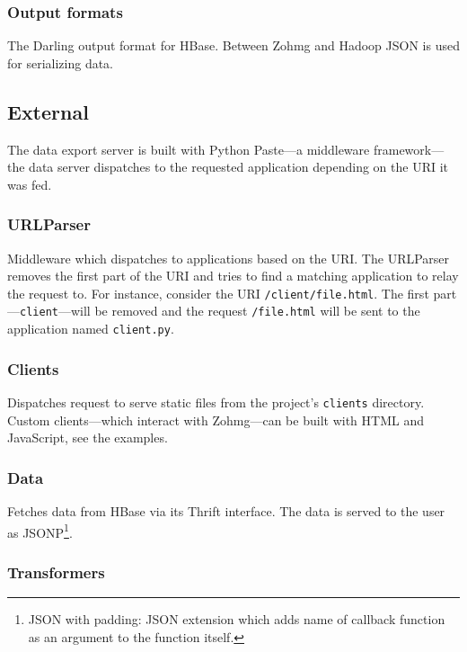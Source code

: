 \documentclass[a4paper,10pt]{book}
\begin{document}
\subsubsection{Output formats}

The Darling output format for HBase. Between Zohmg and Hadoop JSON is used
for serializing data.


\subsection{External}

The data export server is built with Python Paste---a middleware
framework---the data server dispatches to the requested application
depending on the URI it was fed.


\subsubsection{URLParser}

Middleware which dispatches to applications based on the URI. The URLParser
removes the first part of the URI and tries to find a matching application
to relay the request to. For instance, consider the URI
\texttt{/client/file.html}. The first part---\texttt{client}---will be
removed and the request \texttt{/file.html} will be sent to the application
named \texttt{client.py}.


\subsubsection{Clients}

Dispatches request to serve static files from the project's
\texttt{clients} directory. Custom clients---which interact with Zohmg---can
be built with HTML and JavaScript, see the examples.


\subsubsection{Data}

Fetches data from HBase via its Thrift interface. The data is served to the
user as JSONP\footnote{JSON with padding: JSON extension which adds name of
callback function as an argument to the function itself.}.


\subsubsection{Transformers}
\end{document}
